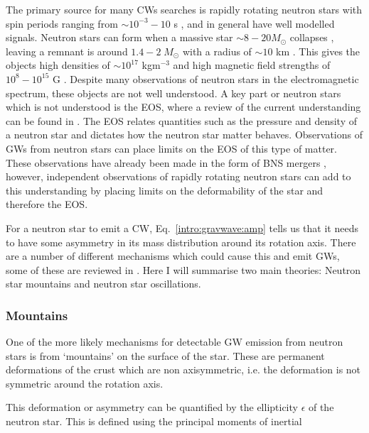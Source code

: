 The primary source for many \glspl{CW} searches is rapidly rotating neutron
stars with spin periods ranging from $\sim 10^{-3} - 10$ s
\citep{manchester2005AustraliaTelescope}, and in general have well modelled signals.  Neutron stars can form when a
massive star $\sim 8 - 20 M_{\odot}$ collapses \citep{fryer2005NeutronStar}, leaving a remnant is around $1.4-2 \;
M_{\odot}$ with a radius of $\sim 10$ km \citep{} . 
This gives the objects high densities of $\sim 10^{17}$ kgm$^{-3}$ and high magnetic field strengths of $10^8 - 10^{15}$ G \citep{konar2017MagneticFields}.  
Despite many observations of neutron stars in the electromagnetic spectrum,
these objects are not well understood.  A key part or neutron stars which is
not understood is the \gls{EOS}, where a review of the current understanding can be
found in \cite{lattimer2016EquationState}.  The \gls{EOS} relates quantities
such as the pressure and density of a neutron star and dictates how the neutron
star matter behaves. Observations of \glspl{GW} from neutron stars can place
limits on the \gls{EOS} of this type of matter.  These observations have
already been made in the form of \gls{BNS} mergers
\citep{abbott2017GW170817Observation}, however, independent observations of
rapidly rotating neutron stars can add to this understanding by placing limits
on the deformability of the star and therefore the \gls{EOS}.

For a neutron star to emit a \gls{CW}, Eq.~\ref{intro:gravwave:amp} tells us that it needs to have some asymmetry in its mass distribution around its rotation axis.  There are a number of different mechanisms which
could cause this and emit \glspl{GW}, some of these are reviewed in
\citep{glampedakis2017GravitationalWaves,riles2017RecentSearches,haskell2015DetectingGravitational,lasky2015GravitationalWaves}.
Here I will summarise two main theories: Neutron star mountains and neutron
star oscillations.

\subsubsection{\label{intro:source:cw:mountain}Mountains}

One of the more likely mechanisms for detectable \gls{GW} emission from neutron
stars is from `mountains' on the surface of the star.  These are permanent
deformations of the crust which are non axisymmetric, i.e. the deformation is
not symmetric around the rotation axis.

This deformation or asymmetry can be quantified by the ellipticity $\epsilon$ of the neutron star.
This is defined using the principal moments of inertial

